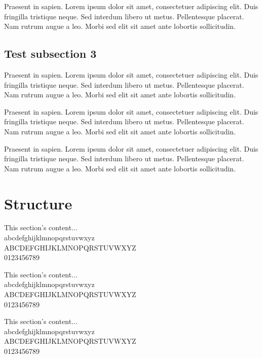 \documentclass[a5paper,12pt,draft]{book} %
\begin{document}
Praesent in sapien. Lorem ipsum dolor sit amet, consectetuer adipiscing elit.
Duis fringilla tristique neque. Sed interdum libero ut metus. Pellentesque placerat.
Nam rutrum augue a leo. Morbi sed elit sit amet ante lobortis sollicitudin.

\subsection*{Test subsection 3}
Praesent in sapien. Lorem ipsum dolor sit amet, consectetuer adipiscing elit.
Duis fringilla tristique neque. Sed interdum libero ut metus. Pellentesque placerat.
Nam rutrum augue a leo. Morbi sed elit sit amet ante lobortis sollicitudin.

Praesent in sapien. Lorem ipsum dolor sit amet, consectetuer adipiscing elit.
Duis fringilla tristique neque. Sed interdum libero ut metus. Pellentesque placerat.
Nam rutrum augue a leo. Morbi sed elit sit amet ante lobortis sollicitudin.

Praesent in sapien. Lorem ipsum dolor sit amet, consectetuer adipiscing elit.
Duis fringilla tristique neque. Sed interdum libero ut metus. Pellentesque placerat.
Nam rutrum augue a leo. Morbi sed elit sit amet ante lobortis sollicitudin.

\section*{Structure}
\indent
\small{This section's content... \\
abcdefghijklmnopqrstuvwxyz \\
ABCDEFGHIJKLMNOPQRSTUVWXYZ \\
0123456789}

\tiny{This section's content... \\
abcdefghijklmnopqrstuvwxyz \\
ABCDEFGHIJKLMNOPQRSTUVWXYZ \\
0123456789}

\normalsize{This section's content... \\
abcdefghijklmnopqrstuvwxyz \\
ABCDEFGHIJKLMNOPQRSTUVWXYZ \\
0123456789}

\clearpage

\vspace*{0.1\textheight}
\clearpage
\end{document}
